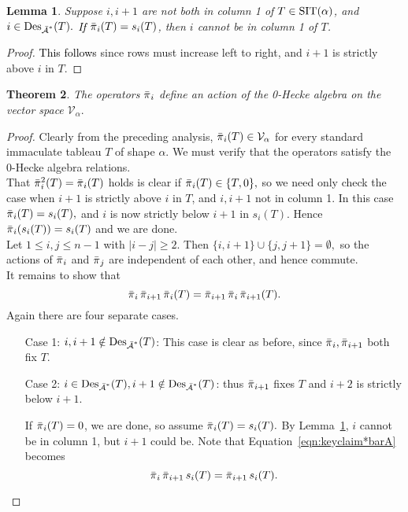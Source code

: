 \documentclass[12pt,letterpaper]{amsart}
\newcommand{\svw}{\textcolor{black}}
\newtheorem{theorem}{Theorem}[section]
\newtheorem{lemma}[theorem]{Lemma}
\theoremstyle{definition}
\DeclareMathOperator{\Des}{Des}
\begin{document}
\begin{lemma}\label{lem:bA} Suppose $i, i+1$ are not both in column 1 of $T\in \operatorname{SIT}(\alpha)$, and $i\in \svw{\Des_{\bA ^*}}(T).$  
\svw{If $\operatorname{\bar{\pi}}_i(T)= s_i(T)$}, then $i$ cannot be in column 1 of $T$.
\end{lemma}
\begin{proof}
\svw{This follows} since rows must increase left to right, and $i+1$ is strictly above $i$ in $T$.
\end{proof}
\begin{theorem}\label{thm:Hecke-action-barA} The operators $\operatorname{\bar{\pi}}_i$ define an action of the 0-Hecke algebra on the vector space $\mathcal{V}_\alpha.$ 
\end{theorem}
\begin{proof}  Clearly from the preceding analysis, $\operatorname{\bar{\pi}}_i(T)\in \mathcal{V}_\alpha$  for every standard immaculate tableau $T$ of shape $\alpha.$ We must verify that the operators satisfy the 0-Hecke algebra relations.
\\
That $\operatorname{\bar{\pi}}_i^2(T)=\operatorname{\bar{\pi}}_i(T)$ holds is clear if $\operatorname{\bar{\pi}}_i(T)\in \{T,0\}, $ so we need only check the case when $i+1$ is strictly above $i$ in $T$, and $i, i+1$  not in column 1. In this case $\operatorname{\bar{\pi}}_i(T)=s_i(T),$ and $i$ is now strictly below $i+1$ in $s_i(T)$. Hence $\operatorname{\bar{\pi}}_i(s_i(T))=s_i(T)$ and we are done.
\\
Let $1\le i,j\le n-1$ with $|i-j|\ge 2.$ Then $\{i, i+1\}\cup \{j, j+1\}=\emptyset,$ so the actions of $\operatorname{\bar{\pi}}_i$ and $\operatorname{\bar{\pi}}_j$ are independent of each other, and hence commute.
\\
It remains to show that 
\begin{equation}\label{eqn:keyclaim*barA}\operatorname{\bar{\pi}}_i \operatorname{\bar{\pi}}_{i+1} \operatorname{\bar{\pi}}_i(T)=\operatorname{\bar{\pi}}_{i+1} \operatorname{\bar{\pi}}_i \operatorname{\bar{\pi}}_{i+1}(T).
\end{equation}
 Again  there are  four separate cases.
\begin{enumerate}
\item[Case 1:] $ i, i+1\notin \Des_{\bA^*}(T)$: This case is clear as before, since $\operatorname{\bar{\pi}}_i, \operatorname{\bar{\pi}}_{i+1}$ both fix $T$.
\item[Case 2:] $ i\in \Des_{\bA^*}(T), i+1\notin \Des_{\bA^*}(T)$: thus $\operatorname{\bar{\pi}}_{i+1}$ fixes $T$ and $i+2$ is strictly below $i+1$.

If $\operatorname{\bar{\pi}}_i(T)=0$, we are done, so assume $\operatorname{\bar{\pi}}_i(T)=s_i(T).$   By Lemma~\ref{lem:bA}, $i$ cannot be in column 1, but $i+1$ could be.  Note that Equation~\eqref{eqn:keyclaim*barA} becomes 
\begin{equation}\label{eqn:barAstep2}\operatorname{\bar{\pi}}_i \operatorname{\bar{\pi}}_{i+1} s_i(T)=\operatorname{\bar{\pi}}_{i+1} s_i(T).\end{equation}


\end{enumerate}
\end{proof}
\end{document}
